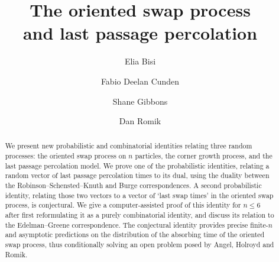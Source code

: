 \documentclass[a4paper,reqno,12pt]{amsart}
\theoremstyle{plain}
\theoremstyle{definition}
\newcommand{\1}{\mathbbm{1}}
\begin{document}
\title[The oriented swap process and last passage percolation]{The oriented swap process \\ and last passage percolation}



\author[E.~Bisi]{Elia Bisi}
\address{Technische Universit\"at Wien \\
Institut f\"ur Stochastik und Wirtschaftsmathematik \\
E 105-07 \\
Wiedner Hauptstra{\ss}e 8-10 \\
1040 Wien, Austria}


\author[F.~D.~Cunden]{Fabio Deelan Cunden}
\address{Dipartimento di Matematica\\
 Universit\`a degli Studi di Bari\\ 
 I-70125 Bari\\
  Italy}

\author[S.~Gibbons]{Shane Gibbons}
\address{School of Mathematics and Statistics\\
University College Dublin\\
Dublin 4, Ireland}

\author[D.~Romik]{Dan Romik}
\address{Department of Mathematics \\ University of California, Davis \\ One Shields Ave
\\ Davis, CA 95616 \\ USA}

\maketitle

\begin{abstract}
We present new probabilistic and combinatorial identities relating three random processes: the oriented swap process on $n$ particles, the corner growth process, and the last passage percolation model. We prove one of the probabilistic identities, relating a random vector of last passage percolation times to its dual, using the duality between the Robinson--Schensted--Knuth and Burge correspondences. A second probabilistic identity, relating those two vectors to a vector of `last swap times' in the oriented swap process, is conjectural. We give a computer-assisted proof of this identity for $n\le 6$ after first reformulating it as a purely combinatorial identity, and discuss its relation to the Edelman--Greene correspondence. The conjectural identity provides precise finite-$n$ and asymptotic predictions on the distribution of the absorbing time of the oriented swap process, thus conditionally solving an open problem posed by Angel, Holroyd and Romik.
\end{abstract}
\end{document}
